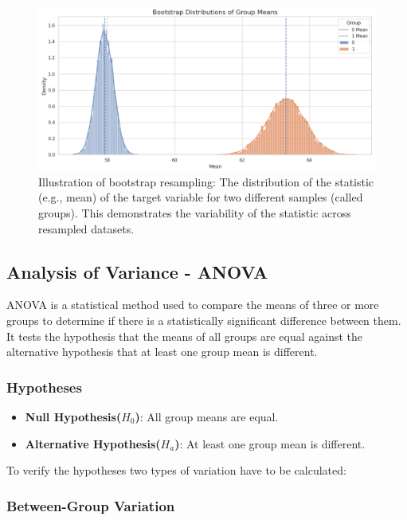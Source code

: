 \begin{center}
\begin{figure}[H]
  \centering
  \includegraphics[width=5in]{img/bootstrap.jpg}
  \caption{Illustration of bootstrap resampling: The distribution of the
  statistic (e.g., mean) of the target variable for two different samples
(called groups). This demonstrates the variability of the statistic across
resampled datasets.}
  \label{Figure:fig_beh}
\end{figure}
\end{center}

\subsection{Analysis of Variance - ANOVA}
ANOVA is a statistical method used to compare the means of three or more groups
to determine if there is a statistically significant difference between them.
It tests the hypothesis that the means of all groups are equal against the
alternative hypothesis that at least one group mean is different.

\subsubsection*{Hypotheses}
\begin{itemize}
  \item \textbf{Null Hypothesis($H_0$)}: All group means are equal.
  \item \textbf{Alternative Hypothesis($H_a$)}: At least one group mean is
    different.
\end{itemize}

\noindent \noindent To verify the hypotheses two types of variation have to
be calculated:

\subsubsection*{Between-Group Variation}

